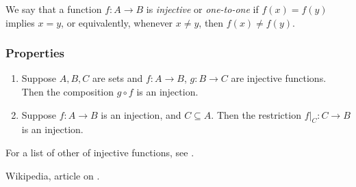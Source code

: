 \documentclass[12pt]{article}
\begin{document}
We say that a function $f\colon A\to B$ is \emph{injective} or \emph{one-to-one} if $f(x)=f(y)$ implies $x=y$, or equivalently, whenever $x\neq y$, then $f(x)\neq f(y)$.

\subsubsection*{Properties}
\begin{enumerate}
\item Suppose $A,B,C$ are sets and $f\colon A\to B$, $g\colon B\to C$
are injective functions. Then the composition $g\circ f$ is an injection. 
\item Suppose $f\colon A\to B$ is an injection, and $C\subseteq A$. Then
the restriction $f|_C\colon C\to B$ is an injection.
\end{enumerate}

For a list of other  of 
injective functions, see \cite{wiki}. 

\begin{thebibliography}{9}
 Wikipedia, article on .
\end{thebibliography}
\end{document}
